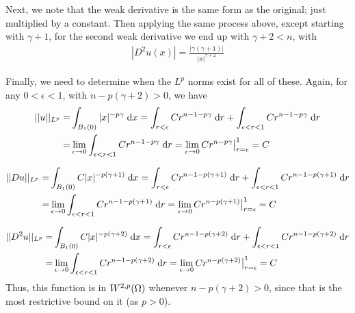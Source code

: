 Next, we note that the weak derivative is the same form as the original; just multiplied by a constant.
Then applying the same process above, except starting with $\gamma + 1$, for the second weak derivative
we end up with $\gamma + 2 < n$, with
\begin{align*}
|D^2 u(x)| = \frac{|\gamma (\gamma + 1)|}{|x|^{\gamma + 2}}
\end{align*}

Finally, we need to determine when the $L^p$ norms exist for all of these.
Again, for any $0 < \epsilon < 1$, with $n - p (\gamma + 2) > 0$, we have
\begin{align*}
||u||_{L^p} = &\int_{B_1(0)} |x|^{-p \gamma} \;\mathrm{d}x
  = \int_{r < \epsilon} C r^{n - 1 - p \gamma} \;\mathrm{d}r + \int_{\epsilon < r < 1} C r^{n - 1 - p \gamma} \;\mathrm{d}r\\
  = &\lim \limits_{\epsilon \rightarrow 0} \int_{\epsilon < r < 1} C r^{n - 1 - p \gamma} \;\mathrm{d}r
  = \lim \limits_{\epsilon \rightarrow 0} C r^{n - p \gamma} \big|_{r = \epsilon}^{1}
  = C
\end{align*}

\begin{align*}
||D u||_{L^p} = &\int_{B_1(0)} C |x|^{-p (\gamma + 1)} \;\mathrm{d}x
  = \int_{r < \epsilon} C r^{n - 1 - p (\gamma + 1)} \;\mathrm{d}r + \int_{\epsilon < r < 1} C r^{n - 1 - p (\gamma + 1)} \;\mathrm{d}r\\
  = &\lim \limits_{\epsilon \rightarrow 0} \int_{\epsilon < r < 1} C r^{n - 1 - p (\gamma + 1)} \;\mathrm{d}r
  = \lim \limits_{\epsilon \rightarrow 0} C r^{n - p (\gamma + 1)} \big|_{r = \epsilon}^{1}
  = C
\end{align*}

\begin{align*}
||D^2 u||_{L^p} = &\int_{B_1(0)} C |x|^{-p (\gamma + 2)} \;\mathrm{d}x
  = \int_{r < \epsilon} C r^{n - 1 - p (\gamma + 2)} \;\mathrm{d}r + \int_{\epsilon < r < 1} C r^{n - 1 - p (\gamma + 2)} \;\mathrm{d}r\\
  = &\lim \limits_{\epsilon \rightarrow 0} \int_{\epsilon < r < 1} C r^{n - 1 - p (\gamma + 2)} \;\mathrm{d}r
  = \lim \limits_{\epsilon \rightarrow 0} C r^{n - p (\gamma + 2)} \big|_{r = \epsilon}^{1}
  = C
\end{align*}
Thus, this function is in $W^{2, p}(\Omega)$ whenever $n - p (\gamma + 2) > 0$,
since that is the most restrictive bound on it (as $p > 0$).
